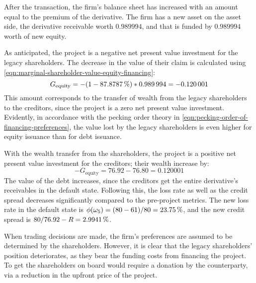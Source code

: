 \documentclass[main.tex]{subfiles}
\begin{document}
        After the transaction, the firm's balance sheet has increased with an amount equal to the premium of the derivative. 
        The firm has a new asset on the asset side, the derivative receivable worth $\num{0.989994}$, and that is funded by $\num{0.989994}$ worth of new equity.

        As anticipated,
        the project is a negative net present value investment for the legacy shareholders. 
        The decrease in the value of their claim is calculated using
        \cref{eqn:marginal-shareholder-value-equity-financing}:
        \begin{equation*}
                G_{\text{equity}}
            =
                - (\num{1} - \pct{0.878787}) * \num{0.989994}
            = 
                -\num{0.120001}
        \end{equation*}
        This amount corresponds to the transfer of wealth 
        from the legacy shareholders to the creditors,
        since the project is a zero net present value investment.
        Evidently, in accordance with the pecking order theory in 
        \cref{eqn:pecking-order-of-financing-preferences},
        the value lost by the legacy shareholders 
        is even higher for equity issuance than for debt issuance.

        With the wealth transfer from the shareholders,
        the project is a positive net present value investment for the creditors;
        their wealth increase by:
        \begin{equation*}\label{eqn:wealth-transfer-equality}
            -G_{\text{equity}} = \num{76.92} - \num{76.80} = \num{0.120001}
        \end{equation*}
        The value of the debt increases, 
        since the creditors get the entire derivative's receivables in the default state. 
        Following this, the loss rate as well as the credit spread decreases significantly 
        compared to the pre-project metrics. 
        The new loss rate in the default state is 
        $\phi(\omega_{5}) = (\num{80}-\num{61})/\num{80} = \pct{0.2375}$, 
        and the new credit spread is $\num{80}/\num{76.92} - \grossrfrate = \pct{0.029941}$.

        When trading decisions are made, the firm's preferences are assumed to be determined by the shareholders.
        However, it is clear that the legacy shareholders' position deteriorates, 
        as they bear the funding costs from financing the project. \\
        To get the shareholders on board would require a donation by the counterparty, 
        via a reduction in the upfront price of the project.
\end{document}

